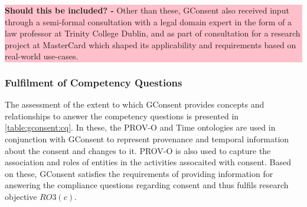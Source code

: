 \colorbox{pink}{\parbox{0.9\textwidth}{\textbf{Should this be included? -} Other than these, GConsent also received input through a semi-formal consultation with a legal domain expert in the form of a law professor at Trinity College Dublin, and as part of consultation for a research project at MasterCard which shaped its applicability and requirements based on real-world use-cases.}}

\subsubsection{Fulfilment of Competency Questions}
The assessment of the extent to which GConsent provides concepts and relationships to answer the competency questions is presented in \autoref{table:gconsent:cq}. 
In these, the PROV-O and Time ontologies are used in conjunction with GConsent to represent provenance and temporal information about the consent and changes to it.
PROV-O is also used to capture the association and roles of entities in the activities assocaited with consent.
Based on these, GConsent satisfies the requirements of providing information for answering the compliance questions regarding consent and thus fulfils research objective $RO3(c)$.
